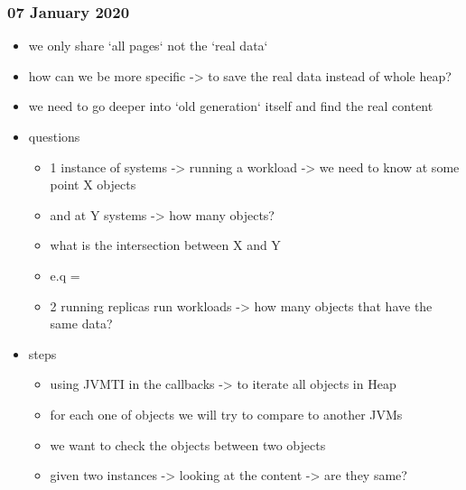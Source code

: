 \subsubsection{07 January 2020}






\begin{itemize}
\item we only share `all pages` not the `real data`
\item how can we be more specific -> to save the real data instead of whole heap?
\item we need to go deeper into `old generation` itself and find the real content
\item questions
  \begin{itemize}
  \item 1 instance of systems -> running a workload -> we need to know at some point X objects
  \item and at Y systems -> how many objects?
  \item what is the intersection between X and Y
  \item e.q =
  \item 2 running replicas run workloads -> how many objects that have the same data?
  \end{itemize}

\item steps
  \begin{itemize}
  \item using JVMTI in the callbacks -> to iterate all objects in Heap
  \item for each one of objects we will try to compare to another JVMs
  \item we want to check the objects between two objects
  \item given two instances -> looking at the content -> are they same?
  \end{itemize}
\end{itemize}